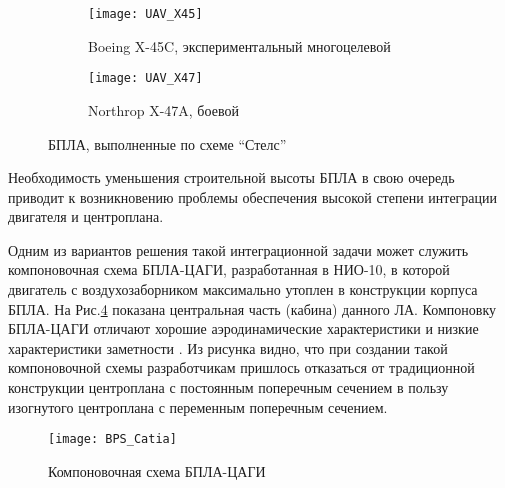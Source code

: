 \begin{figure}[ht]
        \begin{subfigure}[b]{0.47\textwidth}
                \texttt{[image: UAV\_X45]}
                \caption{Boeing X-45C, экспериментальный многоцелевой}
                \label{fig:UAV_X45}
        \end{subfigure}%
        \hspace{\fill}
        \begin{subfigure}[b]{0.47\textwidth}
                \texttt{[image: UAV\_X47]}
                \caption{Northrop X-47A, боевой} %
                \label{fig:UAV_X47}
        \end{subfigure}%
        \caption{БПЛА, выполненные по схеме ``Стелс''}\label{fig:UAVs_stealth}
\end{figure}

Необходимость уменьшения строительной высоты БПЛА в свою очередь приводит к возникновению проблемы обеспечения высокой степени интеграции двигателя и центроплана. 

Одним из вариантов решения такой интеграционной задачи может служить компоновочная схема БПЛА-ЦАГИ, разработанная в НИО-10, в которой двигатель с воздухозаборником максимально утоплен в конструкции корпуса БПЛА.
На Рис.\ref{fig:BPS} показана центральная часть (кабина) данного ЛА. Компоновку БПЛА-ЦАГИ отличают хорошие аэродинамические характеристики и низкие характеристики заметности \cite{BPS_Report}. Из рисунка видно, что при создании такой компоновочной схемы разработчикам пришлось отказаться от традиционной конструкции центроплана с постоянным поперечным сечением в пользу изогнутого центроплана с переменным поперечным сечением.


\begin{figure}[ht]
\centering
\texttt{[image: BPS\_Catia]}
\caption{Компоновочная схема БПЛА-ЦАГИ}
\label{fig:BPS}
\end{figure}






